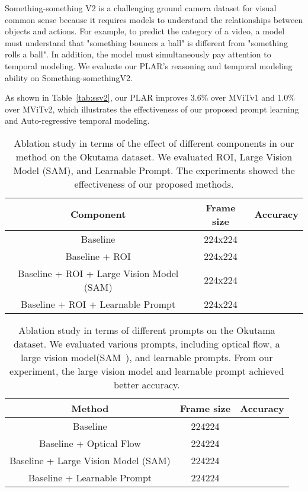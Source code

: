 \documentclass[letterpaper, 10 pt, conference]{ieeeconf}
\begin{document}
Something-something V2 is a challenging ground camera dataset for visual common sense because it requires models to understand the relationships between objects and actions. For example, to predict the category of a video, a model must understand that "something bounces a ball" is different from "something rolls a ball". In addition, the model must simultaneously pay attention to temporal modeling. We evaluate our PLAR's reasoning and temporal modeling ability on Something-somethingV2.

As shown in Table~\ref{tab:ssv2},  our PLAR improves 3.6\% over MViTv1 and 1.0\% over MViTv2, which illustrates the effectiveness of our proposed prompt learning and Auto-regressive temporal modeling. 


\begin{table}[h]
\centering
\begin{tabular}{c c c }
\toprule
Component & Frame size  & Accuracy    \\
\midrule
Baseline & 224x224 &   \\
Baseline + ROI  & 224x224 &   \\
Baseline + ROI + Large Vision Model (SAM) & 224x224 &   \\
Baseline + ROI + Learnable Prompt & 224x224 &   \\
\bottomrule
\end{tabular}
\caption{Ablation study in terms of the effect of different components in our method on the Okutama dataset. We evaluated ROI, Large Vision Model (SAM), and Learnable Prompt. The experiments showed the effectiveness of our proposed methods.}
\label{tab:component}
\vspace{-3mm}
\end{table} \begin{table}[h!]
\centering
\begin{tabular}{c c c }
\toprule
Method & Frame size  & Accuracy    \\
\midrule
Baseline & 224224 &   \\
Baseline + Optical Flow & 224224 &   \\
Baseline + Large Vision Model (SAM) & 224224 &   \\
Baseline + Learnable Prompt & 224224 &   \\
\bottomrule
\end{tabular}
\caption{Ablation study in terms of different prompts on the Okutama dataset. We evaluated various prompts, including optical flow, a large vision model(SAM~\cite{kirillov2023segment}), and learnable prompts. From our experiment, the large vision model and learnable prompt achieved better accuracy.}
\label{tab:prompt}
\vspace{-3mm}
\end{table} 
\end{document}

